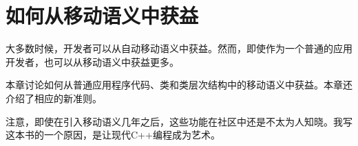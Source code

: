 \chapter{如何从移动语义中获益}
大多数时候，开发者可以从自动移动语义中获益。然而，即使作为一个普通的应用开发者，也可以从移动语义中获益更多。

本章讨论如何从普通应用程序代码、类和类层次结构中的移动语义中获益。本章还介绍了相应的新准则。

注意，即使在引入移动语义几年之后，这些功能在社区中还是不太为人知晓。我写这本书的一个原因，是让现代C++编程成为艺术。




